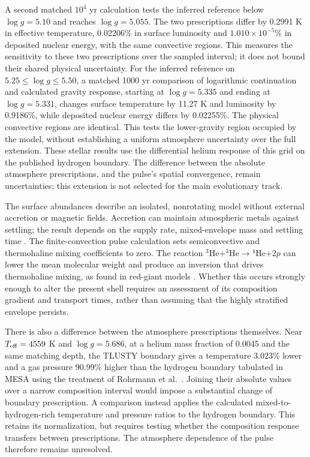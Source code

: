 \documentclass[11pt,letterpaper]{article}
\begin{document}
A second matched $10^4$ yr calculation tests the inferred reference below
$\log g=5.10$ and reaches $\log g=5.055$. The two prescriptions differ by
0.2991 K in effective temperature, 0.02206\% in surface luminosity and
$1.010\times10^{-5}\%$ in deposited nuclear energy, with the same convective
regions. This measures the sensitivity to these two prescriptions over the
sampled interval; it does not bound their shared physical uncertainty.
For the inferred reference on $5.25\leq\log g\leq5.50$, a matched
1000 yr comparison of logarithmic continuation and calculated gravity response,
starting at $\log g=5.335$ and ending at $\log g=5.331$, changes surface
temperature by 11.27 K and luminosity by 0.9186\%, while deposited nuclear
energy differs by 0.02255\%. The physical convective regions are identical.
This tests the lower-gravity region occupied by the model, without establishing
a uniform atmosphere uncertainty over the full extension.
These stellar results use the differential helium response of this grid on
the published hydrogen boundary. The difference between the absolute
atmosphere prescriptions, and the pulse's spatial convergence, remain
uncertainties; this extension is not selected for the main evolutionary track.

The surface abundances describe an isolated, nonrotating model without
external accretion or magnetic fields. Accretion can maintain atmospheric
metals against settling; the result depends on the supply rate, mixed-envelope
mass and settling time \cite{bauer19}. The finite-convection pulse calculation
sets semiconvective and thermohaline mixing coefficients to zero. The reaction
$^3$He+$^3$He$\rightarrow{}^4$He+$2p$ can lower the mean molecular weight and
produce an inversion that drives thermohaline mixing, as found in red-giant
models \cite{charbonnel07}. Whether this occurs strongly enough to alter the
present shell requires an assessment of its composition gradient and transport
times, rather than assuming that the highly stratified envelope persists.

There is also a difference between the atmosphere prescriptions themselves.
Near $T_{\rm eff}=4559$ K and $\log g=5.686$, at a helium mass fraction of
0.0045 and the same matching depth, the TLUSTY boundary gives a temperature
3.023\% lower and a gas pressure 90.99\% higher than the hydrogen boundary
tabulated in MESA using the treatment of Rohrmann et al.\ \cite{rohrmann11,mesa_atm}.
Joining their absolute values over a narrow composition interval would impose
a substantial change of boundary prescription. A comparison instead applies
the calculated mixed-to-hydrogen-rich temperature and pressure ratios to the
hydrogen boundary. This retains its normalization, but requires testing whether
the composition response transfers between prescriptions. The atmosphere
dependence of the pulse therefore remains unresolved.
\end{document}
